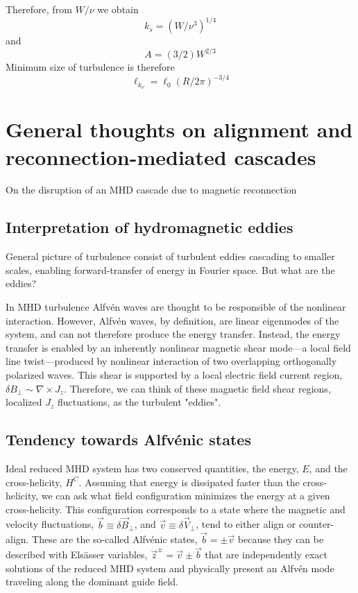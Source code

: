 \documentclass[usenatbib,twocolumn]{aastex63}
\begin{document}
\begin{appendix}
Therefore, from $W/\nu$ we obtain
\begin{equation}
k_s = (W/\nu^3)^{1/4}
\end{equation}
and
\begin{equation}
    A = (3/2) W^{2/3}
\end{equation}
Minimum size of turbulence is therefore
\begin{equation}
    \ell_{k_\nu} = \ell_0 (R/2\pi)^{-3/4}
\end{equation}



\section{General thoughts on alignment and reconnection-mediated cascades}
On the disruption of an MHD cascade due to magnetic reconnection


\subsection{Interpretation of hydromagnetic eddies}

General picture of turbulence consist of turbulent eddies cascading to smaller scales, enabling forward-transfer of energy in Fourier space. 
But what are the eddies?

In MHD turbulence Alfv\'en waves are thought to be responsible of the nonlinear interaction.
However, Alfv\'en waves, by definition, are linear eigenmodes of the system, and can not therefore produce the energy transfer.
Instead, the energy transfer is enabled by an inherently nonlinear magnetic shear mode---a local field line twist---produced by nonlinear interaction of two overlapping orthogonally polarized waves.
This shear is supported by a local electric field current region, $\delta B_\perp \sim \nabla \times J_z$.
Therefore, we can think of these magnetic field shear regions, localized $J_z$ fluctuations, as the turbulent "eddies".

\subsection{Tendency towards Alfv\'enic states }


Ideal reduced MHD system has two conserved quantities, the energy, $E$, and the cross-helicity, $H^C$.
Assuming that energy is dissipated faster than the cross-helicity, we can ask what field configuration minimizes the energy at a given cross-helicity.
This configuration corresponds to a state where the magnetic and velocity fluctuations, $\vec{b}\equiv \delta \vec{B}_\perp$, and $\vec{v}\equiv \delta \vec{V}_\perp$, tend to either align or counter-align.
These are the so-called Alfv\'enic  states, $\vec{b} = \pm \vec{v}$ because they can be described with Els\"asser  variables, $\vec{z}^\pm = \vec{v} \pm \vec{b}$ that are independently exact solutions of the reduced MHD system and physically present an Alfv\'en mode traveling along the dominant guide field.




\end{appendix}
\end{document}
